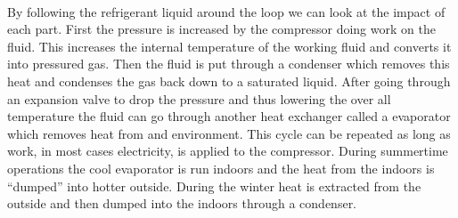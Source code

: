 \setcounter{figure}{2}
%
\\
\noindent
By following the refrigerant liquid around the loop we can look at the impact of each part. First the pressure is increased by the compressor doing work on the fluid. This increases the internal temperature of the working fluid and converts it into pressured gas. Then the fluid is put through a condenser which removes this heat and condenses the gas back down to a saturated liquid. After going through an expansion valve to drop the pressure and thus lowering the over all temperature the fluid can go through another heat exchanger called a evaporator which removes heat from and environment. This cycle can be repeated as long as work, in most cases electricity, is applied to the compressor. During summertime operations the cool evaporator is run indoors and the heat from the indoors is ``dumped'' into hotter outside. During the winter heat is extracted from the outside and then dumped into the indoors through a condenser.
%
%
